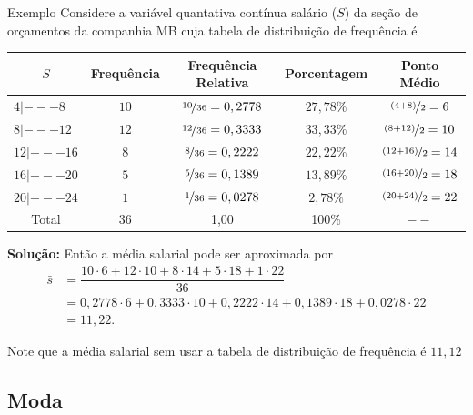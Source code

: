 \documentclass[8pt]{beamer}
\begin{document}
\begin{frame}{Exemplo}
 Considere a variável quantativa contínua salário ($S$) da seção de orçamentos da companhia MB cuja tabela de distribuição de frequência é 
 
 {\tiny
  \begin{table}
   \centering
   \begin{tabular}{l|ccc|c}
    \toprule[0.05cm]
   \multicolumn{1}{c|}{$S$} & Frequência & Frequência Relativa & Porcentagem & Ponto Médio \\ \midrule[0.05cm]
    $4 |--- 8$ & $10$ & $\nicefrac{10}{36}=0,2778$ & $27,78 \%$ & $\nicefrac{(4+8)}{2} = 6$ \\
    $8 |--- 12$ & $12$ & $\nicefrac{12}{36}=0,3333$ & $33,33 \%$ & $\nicefrac{(8+12)}{2} = 10$\\
    $12 |--- 16$ & $8$ & $\nicefrac{8}{36}=0,2222$ & $22,22 \%$ &  $\nicefrac{(12+16)}{2} = 14$\\
    $16 |--- 20$ & $5$ & $\nicefrac{5}{36}=0,1389$ & $13,89 \%$ & $\nicefrac{(16+20)}{2} = 18$\\
    $20 |--- 24$ & $1$ & $\nicefrac{1}{36}=0,0278$ & $2,78 \%$ & $\nicefrac{(20+24)}{2} = 22$\\ \midrule[0.05cm]
   \multicolumn{1}{c|}{Total} & 36 & 1,00 & 100\% & $--$ \\ \bottomrule[0.05cm]
   \end{tabular}
  \end{table}
 }
 
 \textbf{Solução:} Então a média salarial pode ser {\color{red} aproximada} por
 \begin{align*}
  \bar{s} &= \dfrac{10\cdot 6 + 12 \cdot 10 + 8 \cdot 14 + 5 \cdot 18 + 1 \cdot 22}{36}\\
  &= 0,2778 \cdot 6 + 0,3333 \cdot 10 + 0,2222 \cdot 14 + 0,1389 \cdot 18 + 0,0278 \cdot 22\\
  &= 11,22.
 \end{align*}

 {\color{blue} Note que a média salarial sem usar a tabela de distribuição de frequência é $11,12$}
\end{frame}

\subsection{Moda}
\end{document}
